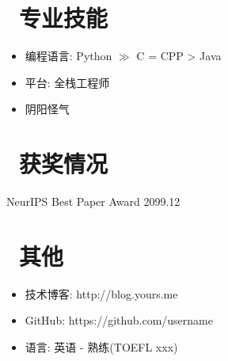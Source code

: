 \section{\makebox[\widthof{\faGraduationCap}][c]{\color{CVBlue}\faCogs}\ 专业技能}

\begin{itemize}[parsep=0.5ex]
  \item 编程语言: Python $\gg$ C = CPP > Java
  \item 平台: 全栈工程师
  \item 阴阳怪气
\end{itemize}

\section{\makebox[\widthof{\faGraduationCap}][c]{\color{CVBlue}\faHeart}\ 获奖情况}
NeurIPS Best Paper Award \hfill 2099.12

\section{\makebox[\widthof{\faGraduationCap}][c]{\color{CVBlue}\faInfo}\ 其他}
\begin{itemize}[parsep=0.5ex]
  \item 技术博客: http://blog.yours.me
  \item GitHub: https://github.com/username
  \item 语言: 英语 - 熟练(TOEFL xxx)
\end{itemize}